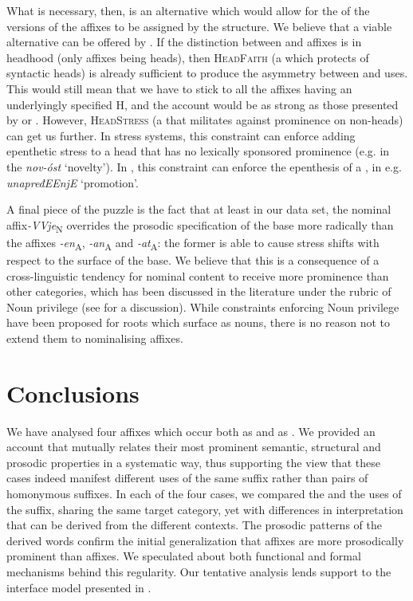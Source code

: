 \documentclass[output=paper, colorlinks, citecolor=brown, newtxmath]{langsci/langscibook}
\begin{document}
What is necessary, then, is an alternative which would allow for the  of the  versions of the affixes to be assigned by the structure.  We believe that a viable alternative can be offered by \cite{Revithiadou1999}. If the distinction between  and  affixes is in headhood (only  affixes being heads), then \textsc{HeadFaith} (a  which protects  of syntactic heads) is already sufficient to produce the asymmetry between  and  uses. This would still mean that we have to stick to all the affixes having an underlyingly specified H, and the account would be as strong as those presented by \cite{Mar2002} or \citet{Arsim2013}. However, \textsc{HeadStress} (a  that militates against prominence on non-heads) can get us further. In stress systems, this constraint can enforce adding epenthetic stress to a head that has no lexically sponsored prominence (e.g. in the  \textit{nov-óst} `novelty'). In , this constraint can enforce the epenthesis of a , in e.g. \textit{unapređEEnjE} `promotion'.

A final piece of the puzzle is the fact that at least in our  data set, the nominal affix\textit{-VVje}\textsubscript{N} overrides the prosodic specification of the base more radically than the  affixes \textit{-en}\textsubscript{A}, \textit{-an}\textsubscript{A} and \textit{-at}\textsubscript{A}: the former is able to cause stress shifts with respect to the surface  of the base. We believe that this is a consequence of a cross-linguistic tendency for nominal content to receive more prominence than other categories, which has been discussed in the literature under the rubric of Noun privilege (see \citealt{Smi2011} for a discussion). While constraints enforcing Noun privilege have been proposed for roots which surface as nouns, there is no reason not to extend them to nominalising affixes.

\section{Conclusions}\label{sec:simonovic:7}
We have analysed four  affixes which occur both as  and as . We provided an account that mutually relates their most prominent semantic, structural and prosodic properties in a systematic way, thus supporting the view that these cases indeed manifest different uses of the same suffix rather than pairs of homonymous suffixes. In each of the four cases, we compared the  and the  uses of the suffix, sharing the same target category, yet with differences in interpretation that can be derived from the different contexts.
The prosodic patterns of the derived words confirm the initial generalization that  affixes are more prosodically prominent than  affixes. We speculated about both functional and formal mechanisms behind this regularity. Our tentative analysis lends support to the interface model presented in \cite{Revithiadou1999}.
\end{document}
